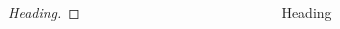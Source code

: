 \begin{columns}
    \begin{column}[]{.5\textwidth}
        \begin{proof}[Heading]
            
        \end{proof}
    \end{column} 
    \begin{column}[]{.5\textwidth}
        \begin{block}{Heading}
            
        \end{block}
    \end{column} 
\end{columns}
